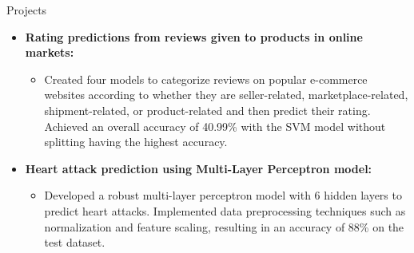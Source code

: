 \documentclass[]{mcdowellcv}
\begin{document}
	\begin{cvsection}{Projects}
		\begin{cvsubsection}{}{}{}
			\begin{itemize}
				\item \textbf{Rating predictions from reviews given to products in online markets:}
				\begin{itemize}
					\item Created four models to categorize reviews on popular e-commerce websites according to whether they are seller-related, marketplace-related, shipment-related, or product-related and then predict their rating. Achieved an overall accuracy of 40.99\% with the SVM model without splitting having the highest accuracy.
				\end{itemize}
				
				
				\item \textbf{Heart attack prediction using Multi-Layer Perceptron model:}
				\begin{itemize}
					\item Developed a robust multi-layer perceptron model with 6 hidden layers to predict heart attacks. Implemented data preprocessing techniques such as normalization and feature scaling, resulting in an accuracy of 88\% on the test dataset.
				\end{itemize}

    

\end{itemize}
\end{cvsubsection}
\end{cvsection}
\end{document}
